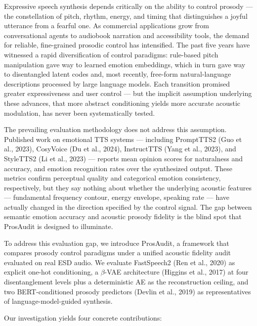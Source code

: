 \documentclass{article}
\begin{document}
\label{sec:introduction}

Expressive speech synthesis depends critically on the ability to control prosody --- the constellation of pitch, rhythm, energy, and timing that distinguishes a joyful utterance from a fearful one. As commercial applications grow from conversational agents to audiobook narration and accessibility tools, the demand for reliable, fine-grained prosodic control has intensified. The past five years have witnessed a rapid diversification of control paradigms: rule-based pitch manipulation gave way to learned emotion embeddings, which in turn gave way to disentangled latent codes and, most recently, free-form natural-language descriptions processed by large language models. Each transition promised greater expressiveness and user control --- but the implicit assumption underlying these advances, that more abstract conditioning yields more accurate acoustic modulation, has never been systematically tested.

The prevailing evaluation methodology does not address this assumption. Published work on emotional TTS systems --- including PromptTTS2 (Guo et al., 2023), CosyVoice (Du et al., 2024), InstructTTS (Yang et al., 2023), and StyleTTS2 (Li et al., 2023) --- reports mean opinion scores for naturalness and accuracy, and emotion recognition rates over the synthesized output. These metrics confirm perceptual quality and categorical emotion consistency, respectively, but they say nothing about whether the underlying acoustic features --- fundamental frequency contour, energy envelope, speaking rate --- have actually changed in the direction specified by the control signal. The gap between semantic emotion accuracy and acoustic prosody fidelity is the blind spot that ProsAudit is designed to illuminate.

To address this evaluation gap, we introduce ProsAudit, a framework that compares prosody control paradigms under a unified acoustic fidelity audit evaluated on real ESD audio. We evaluate FastSpeech2 (Ren et al., 2020) as explicit one-hot conditioning, a $\beta$-VAE architecture (Higgins et al., 2017) at four disentanglement levels plus a deterministic AE as the reconstruction ceiling, and two BERT-conditioned prosody predictors (Devlin et al., 2019) as representatives of language-model-guided synthesis.

Our investigation yields four concrete contributions:
\end{document}
